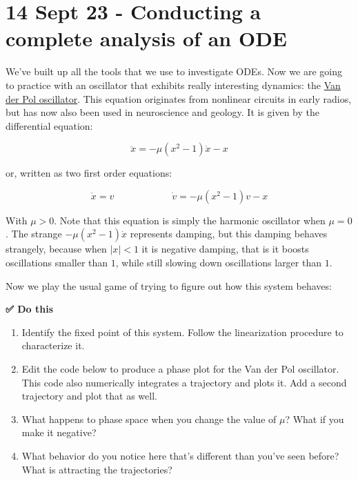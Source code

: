 \section{14 Sept 23 - Conducting a complete analysis of an
ODE}\label{sept-23---conducting-a-complete-analysis-of-an-ode}

We've built up all the tools that we use to investigate ODEs. Now we are
going to practice with an oscillator that exhibits really interesting
dynamics: the
\href{https://en.wikipedia.org/wiki/Van_der_Pol_oscillator}{Van der Pol
oscillator}. This equation originates from nonlinear circuits in early
radios, but has now also been used in neuroscience and geology. It is
given by the differential equation:

\[
\ddot{x} = -\mu (x^2 - 1)\dot{x} - x
\]

or, written as two first order equations:

\[
\dot{x} = v \hspace{1in} \dot{v} = -\mu (x^2 - 1)v - x
\]

With \(\mu > 0\). Note that this equation is simply the harmonic
oscillator when \(\mu = 0\). The strange \(-\mu (x^2 - 1)\dot{x}\)
represents damping, but this damping behaves strangely, because when
\(|x|<1\) it is negative damping, that is it boosts oscillations smaller
than \(1\), while still slowing down oscillations larger than \(1\).

Now we play the usual game of trying to figure out how this system
behaves:

\textbf{✅ Do this}

\begin{enumerate}
\def\labelenumi{\arabic{enumi}.}
\tightlist
\item
  Identify the fixed point of this system. Follow the linearization
  procedure to characterize it.
\item
  Edit the code below to produce a phase plot for the Van der Pol
  oscillator. This code also numerically integrates a trajectory and
  plots it. Add a second trajectory and plot that as well.
\item
  What happens to phase space when you change the value of \(\mu\)? What
  if you make it negative?
\item
  What behavior do you notice here that's different than you've seen
  before? What is attracting the trajectories?
\end{enumerate}

